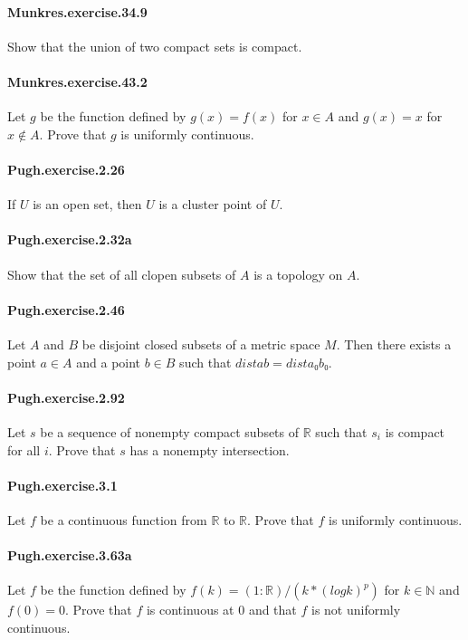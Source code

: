 \documentclass{article}
\begin{document}
\paragraph{Munkres.exercise.34.9} Show that the union of two compact sets is compact.

\paragraph{Munkres.exercise.43.2} Let $g$ be the function defined by $g(x)=f(x)$ for $x \in A$ and $g(x)=x$ for $x \notin A$. Prove that $g$ is uniformly continuous.

\paragraph{Pugh.exercise.2.26} If $U$ is an open set, then $U$ is a cluster point of $U$.

\paragraph{Pugh.exercise.2.32a} Show that the set of all clopen subsets of $A$ is a topology on $A$.

\paragraph{Pugh.exercise.2.46} Let $A$ and $B$ be disjoint closed subsets of a metric space $M$. Then there exists a point $a ∈ A$ and a point $b ∈ B$ such that $dist a b = dist a₀ b₀$.

\paragraph{Pugh.exercise.2.92} Let $s$ be a sequence of nonempty compact subsets of $ℝ$ such that $s_i$ is compact for all $i$. Prove that $s$ has a nonempty intersection.

\paragraph{Pugh.exercise.3.1} Let $f$ be a continuous function from $\mathbb{R}$ to $\mathbb{R}$. Prove that $f$ is uniformly continuous.

\paragraph{Pugh.exercise.3.63a} Let $f$ be the function defined by $f(k) = (1 : ℝ) / (k * (log k) ^ p)$ for $k \in ℕ$ and $f(0) = 0$. Prove that $f$ is continuous at $0$ and that $f$ is not uniformly continuous.
\end{document}
